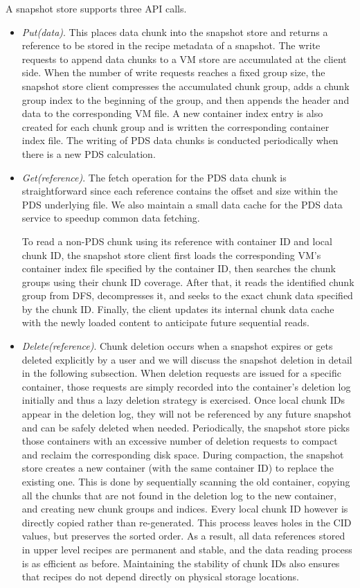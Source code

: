 A snapshot  store supports three API calls.
\begin{itemize}
\item {\em Put(data)}. This places data chunk into the snapshot store and returns a reference to be stored in 
the recipe metadata of a snapshot. 
The write requests to append data chunks to a VM store are accumulated at the client side. 
When the number of write requests reaches a fixed group size, the snapshot store client compresses
the accumulated   chunk group, adds a chunk group index  to the beginning of the group, and then
appends the header and data  to the corresponding VM file.
A new container  index entry is also created for each chunk group and is written the corresponding
container index file.
The writing of PDS data chunks is conducted periodically when there is a new PDS calculation.
\item{\em Get(reference)}.
The fetch operation for the PDS data chunk is straightforward since each reference contains 
the offset and size within the PDS  underlying  file.
We also maintain a small data cache for the PDS data service to speedup common data fetching.

To read a non-PDS chunk using its reference with container ID and local chunk ID,  the snapshot store client first loads the
corresponding VM's container index file specified by the container ID, then searches the chunk
groups  using their  chunk ID coverage.
After that, it reads the identified chunk group from DFS, decompresses it, and seeks to the exact chunk data 
specified by the chunk ID. 
Finally, the client updates its internal chunk data cache with the newly loaded content to 
anticipate future sequential reads.
\item {\em Delete(reference)}.
Chunk deletion occurs when a snapshot expires or gets deleted explicitly by a user
and we will discuss the snapshot deletion in detail in the following subsection.
When deletion requests are issued for a specific container,
those requests are simply recorded into the  container's deletion log initially and thus  a lazy
deletion strategy is exercised.
Once local chunk IDs appear in
the deletion log, they will not be referenced by any future snapshot and can be safely deleted when needed. 
Periodically, the snapshot  store picks those containers with an excessive
number of deletion requests to  compact and  reclaim the corresponding disk space. 
During compaction, the snapshot store creates a new container (with the same container ID) to replace the 
existing one. This is done by sequentially scanning the old container, copying all the chunks that are not 
found in the deletion log to the new container, and creating new chunk groups and indices. 
Every local chunk ID however is directly copied rather than re-generated. This
process leaves holes in the CID values, but preserves the sorted order.
As a result, all data references stored 
in upper level recipes are permanent and stable, and the data reading process
is as efficient as before. Maintaining the stability of chunk IDs also ensures that recipes do not
depend directly on physical storage locations.
\end{itemize}


